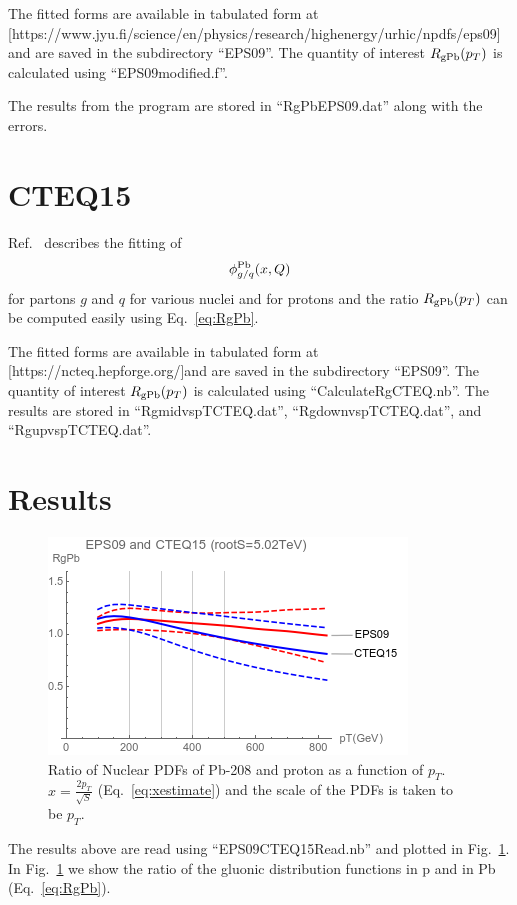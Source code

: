 \documentclass[aps,prd,%
 ]{revtex4}
\begin{document}
The fitted forms are available in tabulated form at
[https://www.jyu.fi/science/en/physics/research/highenergy/urhic/npdfs/eps09]
and are saved in the subdirectory ``EPS09''.  The quantity of interest
$R_{\rm{gPb}}(p_T)$ is calculated using ``EPS09modified.f''.

The results from the program are stored in ``RgPbEPS09.dat'' along with the
errors.

\section{CTEQ15}
Ref.~\cite{Kovarik:2015cma} describes the fitting of 
\begin{equation}
\phi_{g/q}^{\rm{Pb}}(x, Q)
\end{equation}
for partons $g$ and $q$ for various nuclei and for protons and
the ratio $R_{\rm{gPb}}(p_T)$ can be computed easily using Eq.~\ref{eq:RgPb}. 

The fitted forms are available in tabulated form at
[https://ncteq.hepforge.org/]and are saved in the subdirectory ``EPS09''.  The
quantity of interest $R_{\rm{gPb}}(p_T)$ is calculated using
``CalculateRgCTEQ.nb''. The results are stored in ``RgmidvspTCTEQ.dat'',
``RgdownvspTCTEQ.dat'', and ``RgupvspTCTEQ.dat''.


\section{Results}
\begin{figure}[!htbp]
	\includegraphics[scale=0.99]{EPS09CTEQ15RgPb.png}
	\caption{Ratio of Nuclear PDFs of Pb-208 and proton as a function of $p_T$.
    $x=\frac{2p_T}{\sqrt{S}}$ (Eq.~\ref{eq:xestimate}) and the scale of the PDFs is taken
    to be $p_T$.}
	\label{fig:RpPb}
\end{figure}

The results above are read using ``EPS09CTEQ15Read.nb'' and plotted in
Fig.~\ref{fig:RpPb}.  In Fig.~\ref{fig:RpPb} we show the ratio of the gluonic
distribution functions in p and in Pb (Eq.~\ref{eq:RgPb}). 
\end{document}
